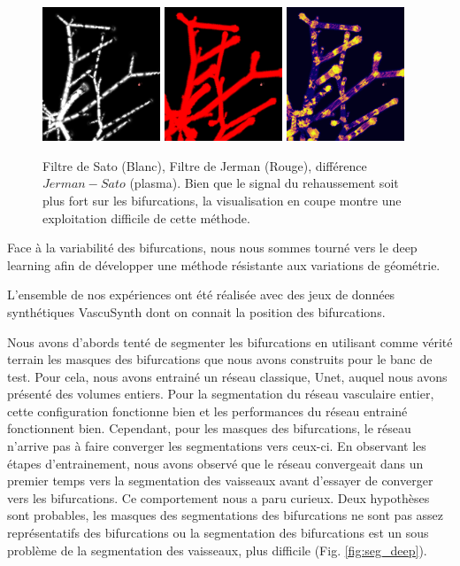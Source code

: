 \begin{figure}[ht]
    \centering
    \includegraphics[height=4cm]{Images/SatoFilter_bif.png}
    \includegraphics[height=4cm]{Images/JermanFilter_bif.png}
    \includegraphics[height=4cm]{Images/subJermanSato_bif.png}
    \caption{Filtre de Sato (Blanc), Filtre de Jerman (Rouge), différence $Jerman - Sato$ (plasma). Bien que le signal du rehaussement soit plus fort sur les bifurcations, la visualisation en coupe montre une exploitation difficile de cette méthode.}
    \label{fig:subtract_vesselness}
\end{figure}

Face à la variabilité des bifurcations, nous nous sommes tourné vers le deep learning afin de développer une méthode résistante aux variations de géométrie.

L'ensemble de nos expériences ont été réalisée avec des jeux de données synthétiques VascuSynth dont on connait la position des bifurcations.

Nous avons d'abords tenté de segmenter les bifurcations en utilisant comme vérité terrain les masques des bifurcations que nous avons construits pour le banc de test. Pour cela, nous avons entrainé un réseau classique, Unet, auquel nous avons présenté des volumes entiers. Pour la segmentation du réseau vasculaire entier, cette configuration fonctionne bien et les performances du réseau entrainé fonctionnent bien. Cependant, pour les masques des bifurcations, le réseau n'arrive pas à faire converger les segmentations vers ceux-ci. En observant les étapes d'entrainement, nous avons observé que le réseau convergeait dans un premier temps vers la segmentation des vaisseaux avant d'essayer de converger vers les bifurcations. Ce comportement nous a paru curieux. Deux hypothèses sont probables, les masques des segmentations des bifurcations ne sont pas assez représentatifs des bifurcations ou la segmentation des bifurcations est un sous problème de la segmentation des vaisseaux, plus difficile (Fig. \ref{fig:seg_deep}).


